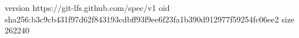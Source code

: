 version https://git-lfs.github.com/spec/v1
oid sha256:b3c9cb431f97d62f843193cdbff93f9ee6f23fa1b390d912977f59254fc06ee2
size 262240
